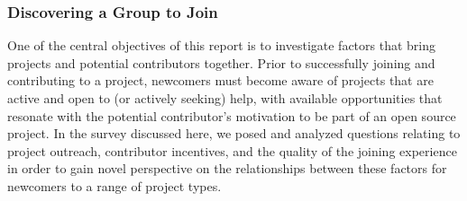\subsubsection{Discovering a Group to Join}

One of the central objectives of this report is to investigate factors that bring projects and potential contributors together. Prior to successfully joining and contributing to a project, newcomers must become aware of projects that are active and open to (or actively seeking) help, with available opportunities that resonate with the potential contributor's motivation to be part of an open source project. In the survey discussed here, we posed and analyzed questions relating to project outreach, contributor incentives, and the quality of the joining experience in order to gain novel perspective on the relationships between these factors for newcomers to a range of project types.